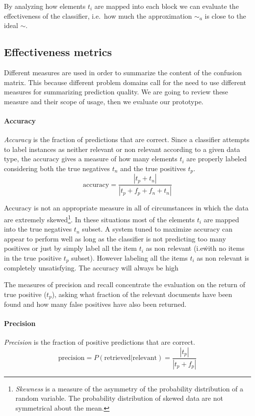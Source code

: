 By analyzing how elements $t_i$ are mapped into each block we can evaluate the effectiveness of the classifier, i.e.\ how much the approximation $\sim_a$ is close to the ideal $\sim$.

\subsection{Effectiveness metrics}
Different measures \cite{manning2008iir} are used in order to summarize the content of the confusion matrix. This because different problem domains call for the need to use different measures for summarizing prediction quality. We are going to review these measure and their scope of usage, then we evaluate our prototype.

\paragraph{Accuracy} \emph{Accuracy} is the fraction of predictions that are correct. Since a classifier attempts to label instances as neither relevant or non relevant according to a given data type, the accuracy gives a measure of how many elements $t_i$ are properly labeled considering both the true negatives $t_n$ and the true positives $t_p$.
\begin{equation}
 \mbox{accuracy} = \frac{|t_p+t_n|}{|t_p+f_p+f_n+t_n|}
\end{equation}

Accuracy is not an appropriate measure in all of circumstances in which the data are extremely skewed\footnote{\emph{Skewness} is a measure of the asymmetry of the probability distribution of a random variable. The probability distribution of skewed data are not symmetrical about the mean.}. In these situations most of the elements $t_i$ are mapped into the true negatives $t_n$ subset. A system tuned to maximize accuracy can appear to perform well as long as the classifier is not predicting too many positives or just by simply label all the item $t_i$ as non relevant (i.e\. with no items in the true positive $t_p$ subset). However labeling all the items $t_i$ as non relevant is completely unsatisfying. The accuracy will always be high 

The measures of precision and recall concentrate the evaluation on the return of true positive ($t_p$), asking what fraction of the relevant documents have been found and how many false positives have also been returned.

\paragraph{Precision} \emph{Precision} is the fraction of positive predictions that are correct.
\begin{equation}
 \mbox{precision} = P(\mbox{retrieved}|\mbox{relevant}) = \frac{|t_p|}{\left|t_p+f_p\right|}
\end{equation}

